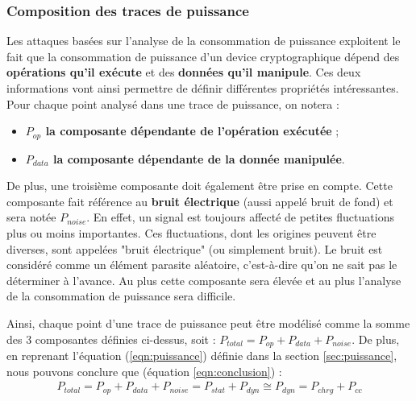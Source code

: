 \documentclass[oneside]{book}
\begin{document}
\vspace{-0.2 cm}
\subsubsection{Composition des traces de puissance}
\vspace{-0.1 cm}Les attaques basées sur l'analyse de la consommation de puissance exploitent le fait que la consommation de puissance d'un device cryptographique dépend des \textbf{opérations qu'il exécute} et des \textbf{données qu'il manipule}. Ces deux informations vont ainsi permettre de définir différentes propriétés intéressantes. Pour chaque point analysé dans une trace de puissance, on notera :
\begin{itemize}
\item \textbf{$P_{op}$ la composante dépendante de l'opération exécutée} ;
\item \textbf{$P_{data}$ la composante dépendante de la donnée manipulée}. \\
\end{itemize}
\vspace{-0.2 cm}De plus, une troisième composante doit également être prise en compte. Cette composante fait référence au \textbf{bruit électrique} (aussi appelé bruit de fond) et sera notée \textbf{$P_{noise}$}. En effet, un signal est toujours affecté de petites fluctuations plus ou moins importantes. Ces fluctuations, dont les origines peuvent être diverses, sont appelées "bruit électrique" (ou simplement bruit). Le bruit est considéré comme un élément parasite aléatoire, c'est-à-dire qu'on ne sait pas le déterminer à l'avance. Au plus cette composante sera élevée et au plus l'analyse de la consommation de puissance sera difficile.

Ainsi, chaque point d'une trace de puissance peut être modélisé comme la somme des 3 composantes définies ci-dessus, soit : 
$P_{total} = P_{op} + P_{data} + P_{noise}$. De plus, en reprenant l'équation (\ref{eqn:puissance}) définie dans la section \ref{sec:puissance}, nous pouvons conclure que (équation \ref{eqn:conclusion}) :
\begin{gather}
	P_{total} = P_{op} + P_{data} + P_{noise} = P_{stat} + P_{dyn} \cong  P_{dyn} = P_{chrg} + P_{cc}\label{eqn:conclusion}
\end{gather}
\end{document}
